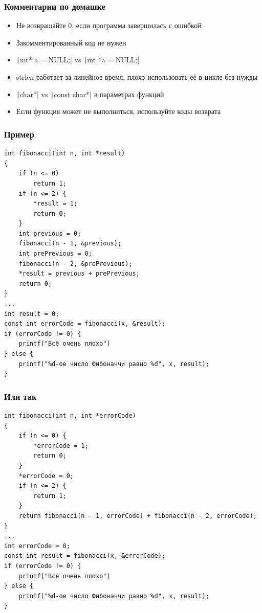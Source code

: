 \documentclass{../../slides-style}
\begin{document}
    
    \begin{frame}[plain]
        \titlepage
    \end{frame}

    \begin{frame}
        \frametitle{Комментарии по домашке}
        \begin{itemize}
            \item Не возвращайте 0, если программа завершилась с ошибкой
            \item Закомментированный код не нужен
            \item \texttt|int* a = NULL;| vs \texttt|int *a = NULL;|
            \item strlen работает за линейное время, плохо использовать её в цикле без нужды
            \item \texttt|char*| vs \texttt|const char*| в параметрах функций
            \item Если функция может не выполниться, используйте коды возврата
        \end{itemize}
    \end{frame}

    \begin{frame}[fragile]
        \frametitle{Пример}
        \begin{scriptsize}
            \begin{verbatim}
int fibonacci(int n, int *result)
{
    if (n <= 0)
        return 1; 
    if (n <= 2) { 
        *result = 1; 
        return 0;
    }
    int previous = 0;
    fibonacci(n - 1, &previous);
    int prePrevious = 0;
    fibonacci(n - 2, &prePrevious);
    *result = previous + prePrevious;
    return 0;
}
...
int result = 0;
const int errorCode = fibonacci(x, &result);
if (errorCode != 0) {
    printf("Всё очень плохо")
} else {
    printf("%d-ое число Фибоначчи равно %d", x, result);
}
            \end{verbatim}
        \end{scriptsize}
    \end{frame}

    \begin{frame}[fragile]
        \frametitle{Или так}
        \begin{scriptsize}
            \begin{verbatim}
int fibonacci(int n, int *errorCode)
{
    if (n <= 0) {
        *errorCode = 1;
        return 0;
    } 
    *errorCode = 0;
    if (n <= 2) { 
        return 1;
    }
    return fibonacci(n - 1, errorCode) + fibonacci(n - 2, errorCode);
}
...
int errorCode = 0;
const int result = fibonacci(x, &errorCode);
if (errorCode != 0) {
    printf("Всё очень плохо")
} else {
    printf("%d-ое число Фибоначчи равно %d", x, result);
}
            \end{verbatim}
        \end{scriptsize}
    \end{frame}
\end{document}
